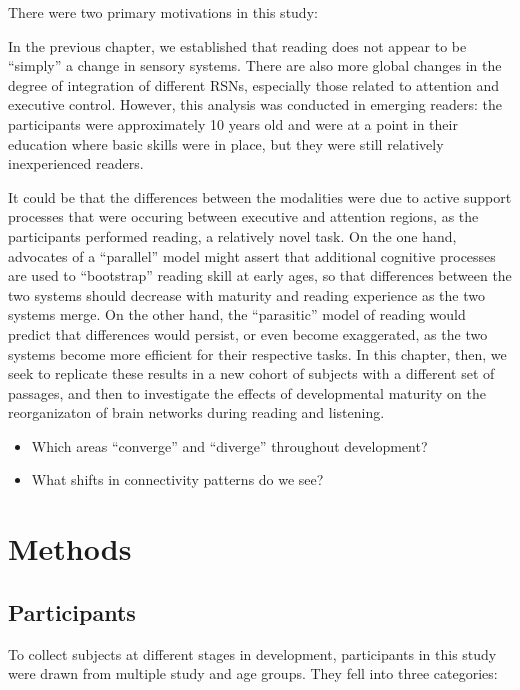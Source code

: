 
There were two primary motivations in this study:

In the previous chapter, we established that reading does not appear to be ``simply'' a change in sensory systems. There are also more global changes in the degree of integration of different RSNs, especially those related to attention and executive control. However, this analysis was conducted in emerging readers: the participants were approximately 10 years old and were at a point in their education where basic skills were in place, but they were still relatively inexperienced readers.

It could be that the differences between the modalities were due to active support processes that were occuring between executive and attention regions, as the participants performed reading, a relatively novel task. On the one hand, advocates of a ``parallel'' model might assert that additional cognitive processes are used to ``bootstrap'' reading skill at early ages, so that differences between the two systems should decrease with maturity and reading experience as the two systems merge. On the other hand, the ``parasitic'' model of reading would predict that differences would persist, or even become exaggerated, as the two systems become more efficient for their respective tasks. In this chapter, then, we seek to replicate these results in a new cohort of subjects with a different set of passages, and then to investigate the effects of developmental maturity on the reorganizaton of brain networks during reading and listening.

\begin{itemize}
	\item Which areas ``converge'' and ``diverge'' throughout development?
	\item What shifts in connectivity patterns do we see?
\end{itemize} 

\section{Methods}

\subsection{Participants}

To collect subjects at different stages in development, participants in this study were drawn from multiple study and age groups. They fell into three categories:

